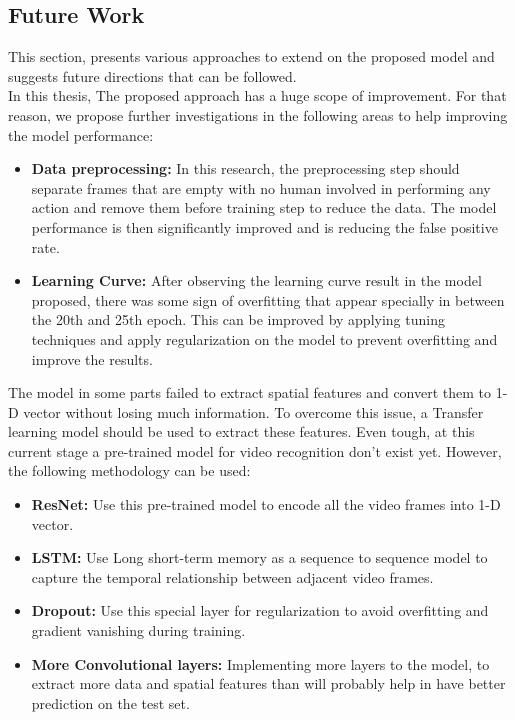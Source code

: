 \subsection{Future Work}
\hspace{5mm} This section, presents various approaches to extend on the proposed model and suggests future directions that can be followed.\\
In this thesis, The proposed approach has a huge scope of improvement. For that reason, we propose further investigations in the following areas to help improving the model performance:
\begin{itemize}
    \item \textbf{Data preprocessing:} In this research, the preprocessing step should separate frames that are empty with no human involved in performing any action and remove them before training step to reduce the data. The model performance is then significantly improved and is reducing the false positive rate.
    \item \textbf{Learning Curve:} After observing the learning curve result in the model proposed, there was some sign of overfitting that appear specially in between the 20th and 25th epoch. This can be improved by applying tuning techniques and apply regularization on the model to prevent overfitting and improve the results.
    
\end{itemize}
\hspace{5mm} The model in some parts failed to extract spatial features and convert them to 1-D vector without losing much information. To overcome this issue, a Transfer learning model should be used to extract these features. Even tough, at this current stage a pre-trained model for video recognition don’t exist yet. However, the following methodology can be used:
\begin{itemize}
    \item \textbf{ResNet:} Use this pre-trained model to encode all the video frames into 1-D vector.
    \item \textbf{LSTM:} Use Long short-term memory as a sequence to sequence model to capture the temporal relationship between adjacent video frames.
    \item \textbf{Dropout:} Use this special layer for regularization to avoid overfitting and gradient vanishing during training.
    \item \textbf{More Convolutional layers:} Implementing more layers to the model, to extract more data and spatial features than will probably help in have better prediction on the test set.
\end{itemize}

